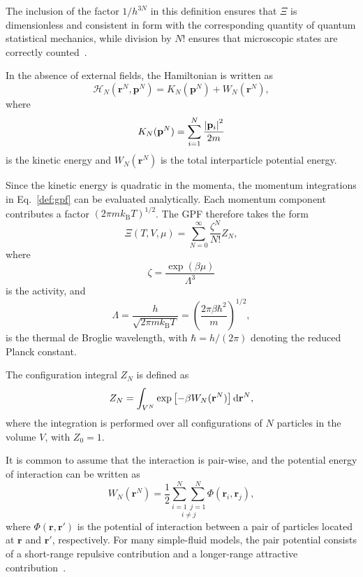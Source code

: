 \documentclass[12pt]{article}
\begin{document}
	The inclusion of the factor $1/h^{3N}$ in this definition ensures that $\Xi$ is dimensionless and consistent in form with the corresponding quantity of quantum statistical mechanics, while division by $N!$ ensures that microscopic states are correctly counted~\cite[p.~23]{HansenMcDonald13}.
	
	In the absence of external fields, the Hamiltonian is written as
	\begin{equation}
		\label{def:hamiltonian}
		\mathcal{H}_N(\mathbf{r}^N, \mathbf{p}^N) = K_N(\mathbf{p}^N) + W_N(\mathbf{r}^N),
	\end{equation}
	where
	\begin{equation}
		K_N(\mathbf{p}^N) = \sum_{i=1}^{N}\frac{\abs{{\mathbf{p}_i}}^2}{2m}
	\end{equation}
	is the kinetic energy and $W_N(\mathbf{r}^N)$ is the total interparticle potential energy.
	
	Since the kinetic energy is quadratic in the momenta, the momentum integrations in Eq.~\eqref{def:gpf} can be evaluated analytically. Each momentum component contributes a factor $(2\pi m k_{\mathrm{B}} T)^{1/2}$. The GPF therefore takes the form	
	\begin{equation}
		\label{gpfCompact}
		\Xi(T, V, \mu) = \sum_{N=0}^{\infty} \frac{\zeta^N}{N!} Z_N,
	\end{equation}
	where
	\begin{equation}
		\zeta = \frac{\exp(\beta \mu)}{\Lambda^3}
	\end{equation}
	is the activity, and
	\begin{equation}
		\Lambda = \frac{h}{\sqrt{2\pi m k_{\mathrm{B}} T}} = \left(\frac{2 \pi \beta \hbar^2}{m} \right)^{1/2},
	\end{equation}
	is the thermal de Broglie wavelength, with $\hbar = h/(2\pi)$ denoting the reduced Planck constant.
	
	The configuration integral $Z_N$ is defined as
	\begin{equation}
		\label{def:confInt}
		Z_N = \int_{V^N} \exp\left[-\beta W_{N}(\mathbf{r}^N)\right]{\rm d}\mathbf{r}^N,
	\end{equation}
	where the integration is performed over all configurations of $N$ particles in the volume $V$, with $Z_0 = 1$.
	
	It is common to assume that the interaction is pair-wise, and the potential energy of interaction can be written as
	\begin{equation}
		\label{potEnergy}
		W_N(\mathbf{r}^N) = \frac{1}{2} \underset{i\neq j}{\sum_{i=1}^{N} \sum_{j = 1}^{N}} \Phi(\mathbf{r}_i, \mathbf{r}_j),
	\end{equation}
	where $\Phi(\mathbf{r}, \mathbf{r}')$ is the potential of interaction between a pair of particles located at $\mathbf{r}$ and $\mathbf{r}'$, respectively. For many simple-fluid models, the pair potential consists of a short-range repulsive contribution and a longer-range attractive contribution~\cite{YRjps24}.
\end{document}
